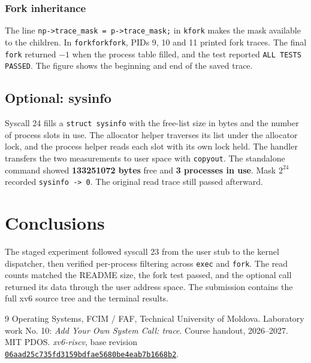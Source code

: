 \clearpage
\subsection{Fork inheritance}
The line \texttt{np->trace\_mask = p->trace\_mask;} in \texttt{kfork} makes the mask available to the children. In \texttt{forkforkfork}, PIDs 9, 10 and 11 printed fork traces. The final \texttt{fork} returned $-1$ when the process table filled, and the test reported \texttt{ALL TESTS PASSED}. The figure shows the beginning and end of the saved trace.

\section{Optional: sysinfo}
Syscall 24 fills a \texttt{struct sysinfo} with the free-list size in bytes and the number of process slots in use. The allocator helper traverses its list under the allocator lock, and the process helper reads each slot with its own lock held. The handler transfers the two measurements to user space with \texttt{copyout}. The standalone command showed \textbf{133251072 bytes} free and \textbf{3 processes in use}. Mask $2^{24}$ recorded \mbox{\texttt{sysinfo -> 0}}. The original read trace still passed afterward.

\clearpage
\chapter{Conclusions}
The staged experiment followed syscall 23 from the user stub to the kernel dispatcher, then verified per-process filtering across \texttt{exec} and \texttt{fork}. The read counts matched the README size, the fork test passed, and the optional call returned its data through the user address space. The submission contains the full xv6 source tree and the terminal results.

\begin{thebibliography}{9}
 Operating Systems, FCIM / FAF, Technical University of Moldova. Laboratory work No. 10: \emph{Add Your Own System Call: trace}. Course handout, 2026--2027.
 MIT PDOS. \emph{xv6-riscv}, base revision
\href{https://github.com/mit-pdos/xv6-riscv/tree/06aad25c735fd3159bdfae5680be4eab7b1668b2}{\texttt{06aad25c735fd3159bdfae5680be4eab7b1668b2}}.
\end{thebibliography}
